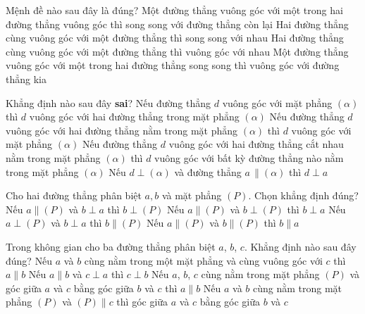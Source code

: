 \begin{ex}%
	Mệnh đề nào sau đây là  đúng?
	 \choice
		{Một đường thẳng vuông góc với một trong hai đường thẳng vuông góc thì song song  với đường thẳng còn lại}
		{Hai đường thẳng  cùng vuông góc với một đường thẳng thì song song với nhau}
		{Hai đường thẳng cùng vuông góc với một đường thẳng thì  vuông góc với nhau}
		{\True Một đường thẳng vuông  góc với một trong hai đường thẳng song song thì vuông góc với đường thẳng kia}
\end{ex}

\begin{ex}%
	Khẳng định nào sau  đây \textbf{sai}?
	 \choice
		{Nếu đường thẳng $d$ vuông góc với mặt phẳng $\left( \alpha \right)$ thì $d$ vuông góc với hai đường thẳng trong mặt  phẳng $\left( \alpha \right)$}
		{\True Nếu đường thẳng $d$ vuông góc với hai đường thẳng nằm trong mặt phẳng $\left( \alpha \right)$ thì $d$  vuông góc với mặt phẳng $\left( \alpha \right)$}
		{Nếu đường thẳng $d$ vuông góc với hai đường thẳng cắt nhau nằm trong mặt phẳng $\left( \alpha \right)$ thì $d$ vuông góc với bất  kỳ đường thẳng nào nằm trong mặt phẳng $\left( \alpha \right)$}
		{Nếu $d\perp \left( \alpha \right)$ và đường  thẳng $a\,\parallel \left( \alpha \right)$ thì $d\perp a$}
\end{ex}

\begin{ex}%
	Cho hai đường thẳng phân biệt $a, b$ và mặt phẳng $(P)$. Chọn  khẳng định đúng?
	 \choice
		{Nếu  $a \parallel (P)$ và $b \perp a$ thì $b \perp(P)$}
		{\True Nếu $a \parallel (P)$ và $b  \perp(P)$ thì $b \perp a$}
		{Nếu $a \perp(P)$ và $b \perp a$ thì  $b \parallel (P)$}
		{Nếu $a \parallel (P)$ và $b \parallel (P)$ thì $b  \parallel a$}
\end{ex}

\begin{ex}%
	Trong không gian cho ba đường thẳng phân biệt $a$, $b$, $c$. Khẳng  định nào sau đây đúng?
	 \choice
		{ Nếu  $a$ và $b$ cùng nằm trong một mặt phẳng và cùng vuông góc với $c$ thì $a\parallel b$}
		 {\True Nếu $a\parallel b$ và $c\perp a$ thì $c\perp b$}
		{Nếu $a$, $b$, $c$ cùng nằm trong mặt phẳng $(P)$ và góc giữa  $a$ và $c$ bằng góc giữa $b$ và $c$ thì $a\parallel b$}
		{Nếu $a$ và $b$ cùng nằm trong mặt phẳng $(P)$  và $(P)\parallel c$ thì góc giữa $a$ và $c$ bằng góc giữa $b$ và $c$}
\end{ex}

